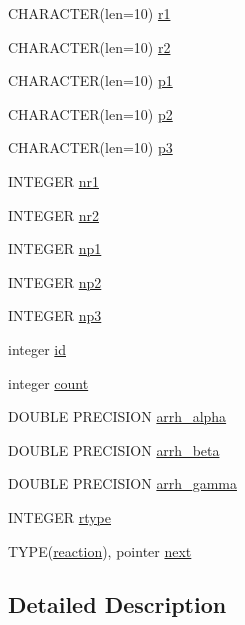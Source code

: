 \begin{DoxyCompactItemize}
\item 
CHARACTER(len=10) \hyperlink{typetypedefs_1_1reaction_a8aae4f0307c7f74eff0b848511d08f14}{r1}
\item 
CHARACTER(len=10) \hyperlink{typetypedefs_1_1reaction_a9371b4d59c6137afcc8816ddd05ff152}{r2}
\item 
CHARACTER(len=10) \hyperlink{typetypedefs_1_1reaction_aa8086371c87bc65ef845558170090071}{p1}
\item 
CHARACTER(len=10) \hyperlink{typetypedefs_1_1reaction_ace6c8faca4889c014c406c0f76c425e2}{p2}
\item 
CHARACTER(len=10) \hyperlink{typetypedefs_1_1reaction_addfb09d35e61a0dbd2e86644d97d0da2}{p3}
\item 
INTEGER \hyperlink{typetypedefs_1_1reaction_a92444b29e559f93abe272d1279e4d581}{nr1}
\item 
INTEGER \hyperlink{typetypedefs_1_1reaction_a7844e0a4df7c687802872bebb37fd187}{nr2}
\item 
INTEGER \hyperlink{typetypedefs_1_1reaction_ac1c2c1f6500c0af1b6f16cb9d9ed6123}{np1}
\item 
INTEGER \hyperlink{typetypedefs_1_1reaction_a155a3a9ab65f1065cb20ee3b756b222e}{np2}
\item 
INTEGER \hyperlink{typetypedefs_1_1reaction_ac0e23b19e555b458e49a3f2c305fe5e9}{np3}
\item 
integer \hyperlink{typetypedefs_1_1reaction_abf0098a01f9d2604a92c9c009fe5f4cd}{id}
\item 
integer \hyperlink{typetypedefs_1_1reaction_a5cc123e51b6e706aa00a46eb6ca5bddc}{count}
\item 
DOUBLE PRECISION \hyperlink{typetypedefs_1_1reaction_afad3fecf2c6d77ed2ea6b5fa543d5f15}{arrh\_\-alpha}
\item 
DOUBLE PRECISION \hyperlink{typetypedefs_1_1reaction_a60b4e74dafe033970715a08389f88525}{arrh\_\-beta}
\item 
DOUBLE PRECISION \hyperlink{typetypedefs_1_1reaction_a48767e6765b50f472713bcafd23f4252}{arrh\_\-gamma}
\item 
INTEGER \hyperlink{typetypedefs_1_1reaction_a8c84f20b9aa91da88786e437d59eaf93}{rtype}
\item 
TYPE(\hyperlink{typetypedefs_1_1reaction}{reaction}), pointer \hyperlink{typetypedefs_1_1reaction_a6daa057b231b087a532b86ae735acc49}{next}
\end{DoxyCompactItemize}


\subsection{Detailed Description}



